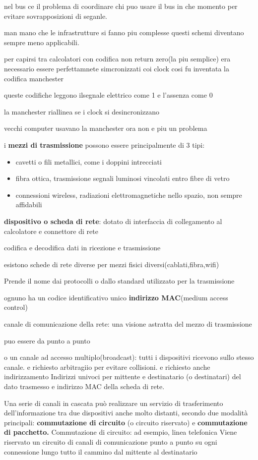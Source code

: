 \documentclass[12pt]{article}
\begin{document}
nel bus ce il problema di coordinare chi puo usare il bus in che momento per evitare sovrapposizioni di seganle.

man mano che le infrastrutture si fanno piu complesse questi schemi diventano sempre meno applicabili.

per capirsi tra calcolatori con codifica non return zero(la piu semplice) era necessario essere perfettamnete simcronizzati coi clock cosi fu inventata la codifica manchester

queste codifiche leggono ilsegnale elettrico come 1 e l’assenza come 0 

la manchester riallinea se i clock si desincronizzano

vecchi computer usavano la manchester ora non e piu un problema


i \textbf{mezzi di trasmissione} possono essere principalmente di 3 tipi:
\begin{itemize}
\item cavetti o fili metallici, come i doppini intrecciati
\item fibra ottica, trasmissione segnali luminosi vincolati entro fibre di vetro
\item connessioni wireless,  radiazioni elettromagnetiche nello spazio, non sempre affidabili
\end{itemize}


\textbf{dispositivo o scheda di rete}:
dotato di interfaccia di collegamento al calcolatore e connettore di rete

codifica e decodifica dati in ricezione e trasmissione

esistono schede di rete diverse per mezzi fisici diversi(cablati,fibra,wifi)

Prende il nome dai protocolli o dallo standard utilizzato per la trasmissione

ognuno ha un codice identificativo unico \textbf{indirizzo MAC}(medium access control)


canale di comunicazione della rete: una visione astratta del mezzo di trasmissione

puo essere da punto a punto

o un canale ad accesso multiplo(broadcast):
tutti i dispositivi ricevono sullo stesso canale. e richiesto arbitragiio per evitare collisioni.
e richiesto anche indirizzamento Indirizzi univoci per mittente e destinatario (o destinatari) del dato trasmesso e indirizzo MAC della scheda di rete.


Una serie di canali in cascata può realizzare un servizio di trasferimento dell’informazione tra due dispositivi
anche molto distanti, secondo due modalità principali: \textbf{commutazione di circuito} (o circuito riservato) e
\textbf{commutazione di pacchetto.}
Commutazione di circuito: ad esempio, linea telefonica Viene riservato un circuito di canali di comunicazione punto a punto su ogni connessione lungo
tutto il cammino dal mittente al destinatario
\end{document}
